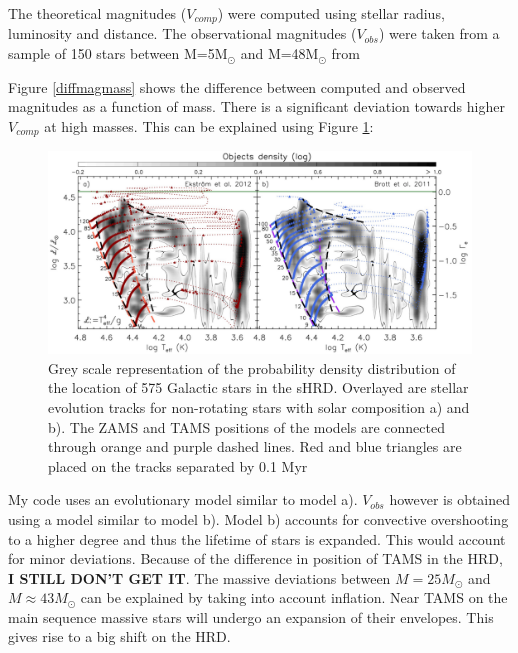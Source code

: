 \documentclass[a4paper,10pt]{article}
\begin{document}
 
 The theoretical magnitudes ($V_{comp}$) were computed using stellar radius, luminosity and distance. The observational magnitudes ($V_{obs}$)
 were taken from a sample of 150 stars between M=5M$_\odot$ and M=48M$_\odot$ from \citep{2014A&A...570L..13C}
 
 Figure \ref{diffmagmass} shows the difference between computed and observed magnitudes as a function of mass. There is a significant
 deviation towards higher $V_{comp}$ at high masses. This can be explained using Figure \ref{castroetal}:
 \begin{figure}
  \includegraphics[width=\textwidth]{Castroetal}
  \caption{Grey scale representation of the probability density distribution of the location of 575 Galactic stars in the sHRD.
  Overlayed are stellar evolution tracks for non-rotating stars with solar composition a)\citet{2012A&A...537A.146E}
  and b)\citet{2011yCat..35309115B}. The ZAMS and TAMS positions of the models are connected through orange and purple dashed lines.
  Red and blue triangles are placed on the tracks separated by 0.1 Myr \citep{2014A&A...570L..13C}\label{castroetal}}
 \end{figure}

 My code uses an evolutionary model similar to model a). $V_{obs}$ however is obtained using a model similar to model b).
 Model b) accounts for convective overshooting to a higher degree and thus the lifetime of stars is expanded. This would account for
 minor deviations. Because of the difference in position of TAMS in the HRD, \textbf{I STILL DON'T GET IT}.
 The massive deviations between $M=25M_\odot$ and $M\approx 43M_\odot$ can be explained by taking into account inflation. 
 Near TAMS on the main sequence massive stars will undergo an expansion of their envelopes. This gives rise to a big shift on the
 HRD.
 
\end{document}
